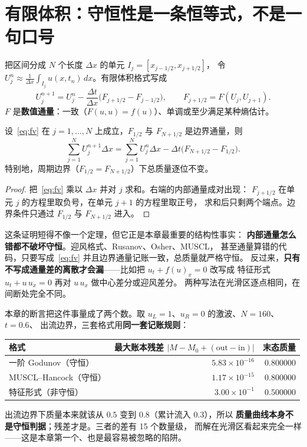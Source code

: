 \section{有限体积：守恒性是一条恒等式，不是一句口号}

\begin{definition}[单元平均与数值通量]
把区间分成 $N$ 个长度 $\Delta x$ 的单元 $I_j=[x_{j-1/2},x_{j+1/2}]$，
令 $U_j^n\approx\frac1{\Delta x}\int_{I_j}u(x,t_n)\,dx$。有限体积格式写成
\begin{equation}
  U_j^{n+1}=U_j^n-\frac{\Delta t}{\Delta x}
  \bigl(F_{j+1/2}-F_{j-1/2}\bigr),
  \qquad F_{j+1/2}=F(U_j,U_{j+1}).
  \label{eq:fv}
\end{equation}
$F$ 是\textbf{数值通量}：一致（$F(u,u)=f(u)$）、单调或至少满足某种熵估计。
\end{definition}

\begin{theorem}[离散守恒]
\label{thm:conservation}
设~\eqref{eq:fv} 在 $j=1,\dots,N$ 上成立，$F_{1/2}$ 与 $F_{N+1/2}$ 是边界通量，则
\begin{equation}
  \sum_{j=1}^N U_j^{n+1}\Delta x
  =\sum_{j=1}^N U_j^{n}\Delta x
  -\Delta t\bigl(F_{N+1/2}-F_{1/2}\bigr).
  \label{eq:conservation}
\end{equation}
特别地，周期边界（$F_{1/2}=F_{N+1/2}$）下总质量逐位不变。
\end{theorem}

\begin{proof}
把~\eqref{eq:fv} 乘以 $\Delta x$ 并对 $j$ 求和。右端的内部通量成对出现：
$F_{j+1/2}$ 在单元 $j$ 的方程里取负号，在单元 $j+1$ 的方程里取正号，
求和后只剩两个端点。边界条件只通过 $F_{1/2}$ 与 $F_{N+1/2}$ 进入。
\end{proof}

这条证明短得不像一个定理，但它正是本章最重要的结构性事实：
\textbf{内部通量怎么错都不破坏守恒}。迎风格式、Rusanov、Osher、MUSCL，
甚至通量算错的代码，只要写成~\eqref{eq:fv} 并且边界通量记账一致，总质量就严格守恒。
反过来，\textbf{只有不写成通量差的离散才会漏}——比如把 $u_t+f(u)_x=0$ 改写成
特征形式 $u_t+u\,u_x=0$ 再对 $u\,u_x$ 做中心差分或迎风差分。
两种写法在光滑区逐点相同，在间断处完全不同。

本章的断言把这件事量成了两个数。取 $u_L=1$、$u_R=0$ 的激波、$N=160$、$t=0.6$、
出流边界，三套格式用\textbf{同一套记账规则}：
\begin{center}
\begin{tabular}{@{}lrr@{}}
\toprule
格式 & 最大账本残差 $|M-M_0+(\text{out}-\text{in})|$ & 末态质量 \\
\midrule
一阶 Godunov（守恒） & $5.83\times10^{-16}$ & $0.800000$ \\
MUSCL--Hancock（守恒） & $1.17\times10^{-15}$ & $0.800000$ \\
特征形式（非守恒） & $3.00\times10^{-1}$ & $0.500000$ \\
\bottomrule
\end{tabular}
\end{center}
出流边界下质量本来就该从 $0.5$ 变到 $0.8$（累计流入 $0.3$），所以
\textbf{质量曲线本身不是守恒判据}；残差才是。三者的差有 15 个数量级，
而解在光滑区看起来完全一样——这是本章第一个、也是最容易被忽略的陷阱。

